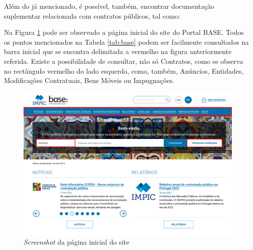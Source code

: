 Além do já mencionado, é possível, também, encontrar documentação suplementar relacionada com contratos públicos, tal como:

%	
%


\begin{table}[h!]
	\centering
	\caption{Documentação suplementar disponível no Portal BASE}
	\label{tab:base}
\end{table}

Na Figura \ref{fig:site1} pode ser observado a página inicial do site do Portal BASE. Todos os pontos mencionados na Tabela \ref{tab:base} podem ser facilmente consultados na barra inicial que se encontra delimitada a vermelho na figura anteriormente referida. Existe a possibilidade de consultar, não só Contratos, como se observa no rectângulo vermelho do lado esquerdo, como, também, Anúncios, Entidades, Modificações Contratuais, Bens Móveis ou Impugnações. 

\begin{figure}[H]
	\centering
	\includegraphics[width=.95\textwidth]{imagens/portalbase_init_v2.png}
	\caption{\textit{Screenshot} da página inicial do site}
	\label{fig:site1}
\end{figure}

